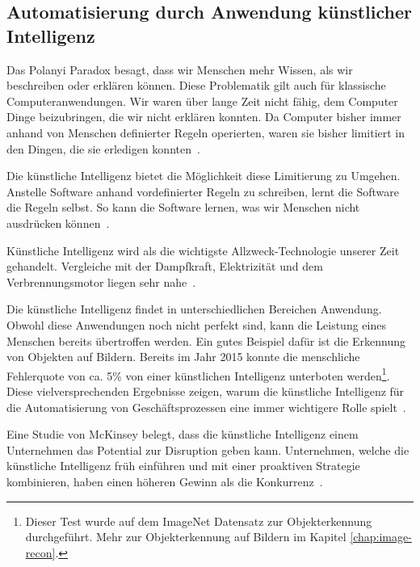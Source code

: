 \subsection{Automatisierung durch Anwendung künstlicher Intelligenz}

Das Polanyi Paradox besagt, dass wir Menschen mehr Wissen, als wir beschreiben oder erklären können. Diese Problematik gilt auch für klassische Computeranwendungen. Wir waren über lange Zeit nicht fähig, dem Computer Dinge beizubringen, die wir nicht erklären konnten. Da Computer bisher immer anhand von Menschen definierter Regeln operierten, waren sie bisher limitiert in den Dingen, die sie erledigen konnten~\autocite{McAfee}. 

Die künstliche Intelligenz bietet die Möglichkeit diese Limitierung zu Umgehen. Anstelle Software anhand vordefinierter Regeln zu schreiben, lernt die Software die Regeln selbst. So kann die Software lernen, was wir Menschen nicht ausdrücken können~\autocite{McAfee}.

Künstliche Intelligenz wird als die wichtigste Allzweck-Technologie unserer Zeit gehandelt. Vergleiche mit der Dampfkraft, Elektrizität und dem Verbrennungsmotor liegen sehr nahe~\autocite{McAfee}.

Die künstliche Intelligenz findet in unterschiedlichen Bereichen Anwendung. Obwohl diese Anwendungen noch nicht perfekt sind, kann die Leistung eines Menschen bereits übertroffen werden. Ein gutes Beispiel dafür ist die Erkennung von Objekten auf Bildern. Bereits im Jahr 2015 konnte die menschliche Fehlerquote von ca. 5\% von einer künstlichen Intelligenz unterboten werden\footnote{Dieser Test wurde auf dem ImageNet Datensatz zur Objekterkennung durchgeführt. Mehr zur Objekterkennung auf Bildern im Kapitel \ref{chap:image-recon}.}. Diese vielversprechenden Ergebnisse zeigen, warum die künstliche Intelligenz für die Automatisierung von Geschäftsprozessen eine immer wichtigere Rolle spielt~\autocite{McAfee}.

Eine Studie von McKinsey belegt, dass die künstliche Intelligenz einem Unternehmen das Potential zur Disruption geben kann. Unternehmen, welche die künstliche Intelligenz früh einführen und mit einer proaktiven Strategie kombinieren, haben einen höheren Gewinn als die Konkurrenz~\autocite{Bughin}. 

